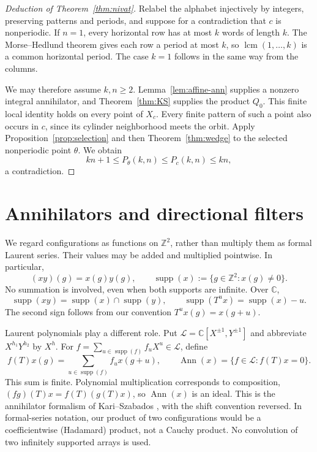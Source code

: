 \documentclass[11pt]{article}
\numberwithin{equation}{section}
\theoremstyle{definition}
\theoremstyle{remark}
\newcommand{\Z}{\mathbb Z}
\newcommand{\C}{\mathbb C}
\newcommand{\Ann}{\operatorname{Ann}}
\newcommand{\supp}{\operatorname{supp}}
\newcommand{\Laur}{\mathscr L}
\DeclareMathOperator{\lcm}{lcm}
\begin{document}
\begin{proof}[Deduction of Theorem~\ref{thm:nivat}]
Relabel the alphabet injectively by integers, preserving patterns and periods, and suppose for a
contradiction that $c$ is nonperiodic. If $n=1$, every horizontal row has at most $k$ words of
length $k$. The Morse--Hedlund theorem \cite[Theorem~2.2(iii)]{CK} gives each row a period at most $k$, so $\lcm(1,\ldots,k)$ is a common horizontal period. The case $k=1$ follows in the same way from the columns.

We may therefore assume $k,n\ge2$. Lemma~\ref{lem:affine-ann} supplies a nonzero integral annihilator, and Theorem~\ref{thm:KS} supplies the product $Q_0$. This finite local identity holds on every point of $X_c$. Every finite pattern of such a point also occurs in $c$, since its cylinder neighborhood meets the orbit. Apply Proposition~\ref{prop:selection} and then Theorem~\ref{thm:wedge} to the selected nonperiodic point $\theta$. We obtain
\[
 kn+1\le P_\theta(k,n)\le P_c(k,n)\le kn,
\]
a contradiction.
\end{proof}

\section{Annihilators and directional filters}\label{sec:algebra}
We regard configurations as functions on $\Z^2$, rather than multiply them as formal Laurent
series. Their values may be added and multiplied pointwise. In particular,
\[
 (xy)(g)=x(g)y(g),\qquad
 \supp(x):=\{g\in\Z^2:x(g)\ne0\}.
\]
No summation is involved, even when both supports are infinite. Over $\C$,
\begin{equation}\label{eq:pointwise-support}
 \supp(xy)=\supp(x)\cap\supp(y),\qquad
 \supp(T^u x)=\supp(x)-u.
\end{equation}
The second sign follows from our convention $T^u x(g)=x(g+u)$.

Laurent polynomials play a different role. Put $\Laur=\C[X^{\pm1},Y^{\pm1}]$ and abbreviate
$X^{h_1}Y^{h_2}$ by $X^h$. For $f=\sum_{u\in\supp(f)}f_uX^u\in\Laur$, define
\begin{equation}\label{eq:finite-action}
 f(T)x(g)=\sum_{u\in\supp(f)} f_u x(g+u),\qquad
 \Ann(x)=\{f\in\Laur:f(T)x=0\}.
\end{equation}
This sum is finite. Polynomial multiplication corresponds to composition,
$(fg)(T)x=f(T)(g(T)x)$, so $\Ann(x)$ is an ideal. This is the annihilator formalism of
Kari--Szabados \cite[Section~2]{KS}, with the shift convention reversed. In formal-series notation,
our product of two configurations would be a coefficientwise (Hadamard) product, not a Cauchy
product. No convolution of two infinitely supported arrays is used.
\end{document}
